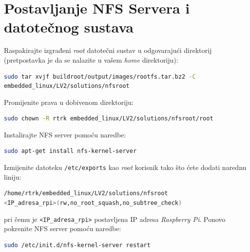 \documentclass[11pt]{article}
\begin{document}
\section{Postavljanje NFS Servera i datotečnog sustava}
Raspakirajte izgrađeni \textit{root} datotečni sustav u odgovarajući direktorij
 (pretpostavka je da se nalazite u vašem \textit{home} direktoriju):
\begin{lstlisting}[language=bash]
sudo tar xvjf buildroot/output/images/rootfs.tar.bz2 -C
embedded_linux/LV2/solutions/nfsroot
\end{lstlisting}
Promijenite prava u dobivenom direktoriju:
\begin{lstlisting}[language=bash]
sudo chown -R rtrk embedded_linux/LV2/solutions/nfsroot/root
\end{lstlisting}
Instalirajte NFS server pomoću naredbe:
\begin{lstlisting}[language=bash]
sudo apt-get install nfs-kernel-server
\end{lstlisting}
Izmijenite datoteku \texttt{/etc/exports} kao \textit{root} korisnik tako što
 ćete dodati narednu liniju:
\begin{lstlisting}[language=bash]
/home/rtrk/embedded_linux/LV2/solutions/nfsroot
<IP_adresa_rpi>(rw,no_root_squash,no_subtree_check)
\end{lstlisting}
pri čemu je \texttt{<IP\_adresa\_rpi>} postavljena IP adresa \textit{Raspberry Pi}.
Ponovo pokrenite NFS server pomoću naredbe:
\begin{lstlisting}[language=bash]
sudo /etc/init.d/nfs-kernel-server restart
\end{lstlisting}
\end{document}
